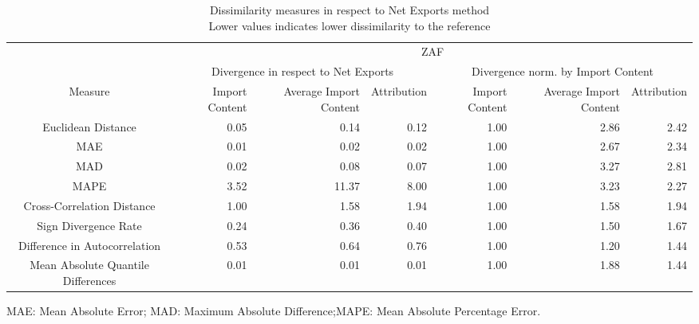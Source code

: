 \begin{table}[t]
\caption*{
{\large Dissimilarity measures in respect to Net Exports method} \\ 
{\small Lower values indicates lower dissimilarity to the reference}
} 
\fontsize{15.0pt}{18.0pt}\selectfont
\begin{tabular*}{\linewidth}{@{\extracolsep{\fill}}crrrrrr}
\toprule
 & \multicolumn{6}{c}{ZAF} \\ 
\cmidrule(lr){2-7}
 & \multicolumn{3}{c}{Divergence in respect to Net Exports} & \multicolumn{3}{c}{Divergence norm. by Import Content} \\ 
\cmidrule(lr){2-4} \cmidrule(lr){5-7}
Measure & Import Content & Average Import Content & Attribution & Import Content & Average Import Content & Attribution \\ 
\midrule\addlinespace[2.5pt]
Euclidean Distance & 0.05 & 0.14 & 0.12 & 1.00 & 2.86 & 2.42 \\ 
MAE & 0.01 & 0.02 & 0.02 & 1.00 & 2.67 & 2.34 \\ 
MAD & 0.02 & 0.08 & 0.07 & 1.00 & 3.27 & 2.81 \\ 
MAPE & 3.52 & 11.37 & 8.00 & 1.00 & 3.23 & 2.27 \\ 
Cross-Correlation Distance & 1.00 & 1.58 & 1.94 & 1.00 & 1.58 & 1.94 \\ 
Sign Divergence Rate & 0.24 & 0.36 & 0.40 & 1.00 & 1.50 & 1.67 \\ 
Difference in Autocorrelation & 0.53 & 0.64 & 0.76 & 1.00 & 1.20 & 1.44 \\ 
Mean Absolute Quantile Differences & 0.01 & 0.01 & 0.01 & 1.00 & 1.88 & 1.44 \\ 
\bottomrule
\end{tabular*}
\begin{minipage}{\linewidth}
MAE: Mean Absolute Error; MAD: Maximum Absolute Difference;MAPE: Mean Absolute Percentage Error.\\
\end{minipage}
\end{table}


